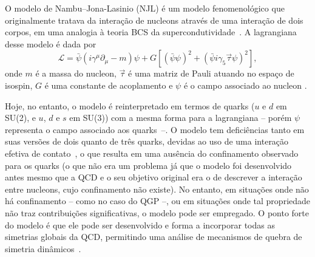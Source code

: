 O modelo de Nambu--Jona-Lasinio (NJL) é um modelo fenomenológico que originalmente tratava da interação de nucleons através de uma interação de dois corpos, em uma analogia à teoria BCS da supercondutividade~\cite{Buballa}. A lagrangiana desse modelo é dada por
\begin{equation}
	\mathcal{L} = \bar{\psi}(i\gamma^\mu\partial_\mu - m)\psi + G[(\bar{\psi}\psi)^2 + (\bar{\psi}i\gamma_5\vec{\tau}\psi)^2],
\end{equation}
%
onde $m$ é a massa do nucleon, $\vec{\tau}$ é uma matriz de Pauli atuando no espaço de isospin, $G$ é uma constante de acoplamento e $\psi$ é o campo associado ao nucleon \cite{Buballa}.

Hoje, no entanto, o modelo é reinterpretado em termos de quarks ($u$ e $d$ em SU(2), e $u$, $d$ e $s$ em SU(3)) com a mesma forma para a lagrangiana -- porém $\psi$ representa o campo associado aos quarks~--. O modelo tem deficiências tanto em suas versões de dois quanto de três quarks, devidas ao uso de uma interação efetiva de contato~\cite{Klevansky}, o que resulta em uma ausência do confinamento observado para os quarks (o que não era um problema já que o modelo foi desenvolvido antes mesmo que a QCD e o seu objetivo original era o de descrever a interação entre nucleons, cujo confinamento não existe). No entanto, em situações onde não há confinamento -- como no caso do QGP --, ou em situações onde tal propriedade não traz contribuições significativas, o modelo pode ser empregado. O ponto forte do modelo é que ele pode ser desenvolvido e forma a incorporar todas as simetrias globais da QCD, permitindo uma análise de mecanismos de quebra de simetria dinâmicos~\cite{Vogl}.


